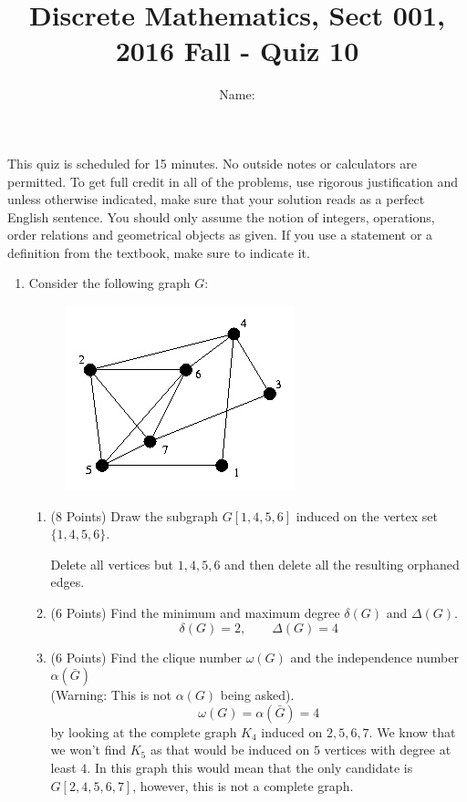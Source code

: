 \documentclass[11pt]{preprint}
\title{Discrete Mathematics, Sect 001, 2016 Fall - Quiz 10}
\author{Name:}
\institute{Courant Institute of Mathematical Sciences, NYU}
\begin{document}
\maketitle

This quiz is scheduled for 15 minutes. No outside notes or calculators are permitted. To get full credit  in all of the problems, use rigorous justification and unless otherwise indicated, make sure that your solution reads as a perfect English sentence. You should only assume the notion of integers, operations, order relations and geometrical objects as given. If you use a statement or a definition from the textbook, make sure to indicate it.
\vspace{0.2cm}


\begin{enumerate}
\item Consider the following graph $G$:

\begin{figure}[h]
\centering
\includegraphics[scale=1]{Euler.jpg}
\end{figure}

\begin{enumerate}
\item (8 Points) Draw the subgraph $G[1,4,5,6]$ induced on the vertex set $\{1,4,5,6\}$.\vspace{0.5cm}

Delete all vertices but $1,4,5,6$ and then delete all the resulting orphaned edges.
\item (6 Points) Find the minimum and maximum degree $\delta(G)$ and $\Delta(G)$.
\[
\delta(G) = 2,\qquad\Delta(G)=4
\]


\item (6 Points) Find the clique number $\omega(G)$ and the independence number $\alpha(\bar{G})$\\ (Warning: This is not $\alpha(G)$
 being asked).
 \[
 \omega(G)=\alpha(\bar{G})=4
 \]
 by looking at the complete graph $K_4$ induced on $2,5,6,7$. We know that we won't find $K_5$ as that would be induced on $5$ vertices with degree at least $4$. In this graph this would mean that the only candidate is $G[2,4,5,6,7]$, however, this is not a complete graph.
\end{enumerate}
\end{enumerate}
\end{document}
